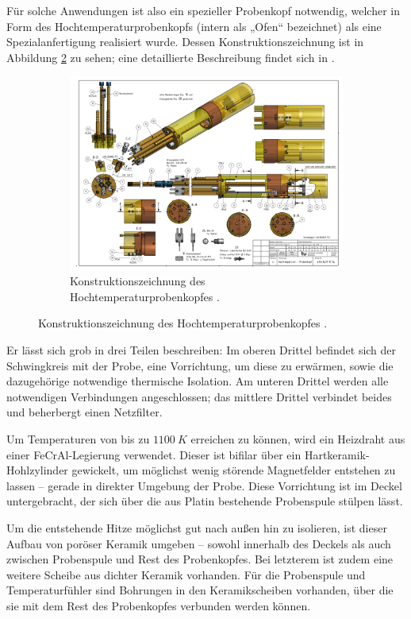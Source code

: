 Für solche Anwendungen ist also ein spezieller Probenkopf notwendig, welcher in Form des Hochtemperaturprobenkopfs (intern als „Ofen“ bezeichnet) als eine Spezialanfertigung realisiert wurde. Dessen Konstruktionszeichnung ist in Abbildung \ref{fig:exp:ofen_aufbau} zu sehen; eine detaillierte Beschreibung findet sich in \cite{tilly_master}.

\begin{figure}
	\begin{figure}[H]
		\includegraphics[width=1.05\textheight]{graphics/ofen/ofen_aufbau2.pdf}
		\caption{Konstruktionszeichnung des Hochtemperaturprobenkopfes \cite{Rudloff_blue_print}.}
		\label{fig:exp:ofen_aufbau}
	\end{figure}
\end{figure}

Er lässt sich grob in drei Teilen beschreiben: Im oberen Drittel befindet sich der Schwingkreis mit der Probe, eine Vorrichtung, um diese zu erwärmen, sowie die dazugehörige notwendige thermische Isolation. Am unteren Drittel werden alle notwendigen Verbindungen angeschlossen; das mittlere Drittel verbindet beides und beherbergt einen Netzfilter.

Um Temperaturen von bis zu $\SI{1100}{K}$ erreichen zu können, wird ein Heizdraht aus einer FeCrAl-Legierung verwendet. Dieser ist bifilar über ein Hartkeramik-Hohlzylinder gewickelt, um möglichst wenig störende Magnetfelder entstehen zu lassen -- gerade in direkter Umgebung der Probe. Diese Vorrichtung ist im Deckel untergebracht, der sich über die aus Platin bestehende Probenspule stülpen lässt.

Um die entstehende Hitze möglichst gut nach außen hin zu isolieren, ist dieser Aufbau von poröser Keramik umgeben -- sowohl innerhalb des Deckels als auch zwischen Probenspule und Rest des Probenkopfes. Bei letzterem ist zudem eine weitere Scheibe aus dichter Keramik vorhanden. Für die Probenspule und Temperaturfühler sind Bohrungen in den Keramikscheiben vorhanden, über die sie mit dem Rest des Probenkopfes verbunden werden können.

